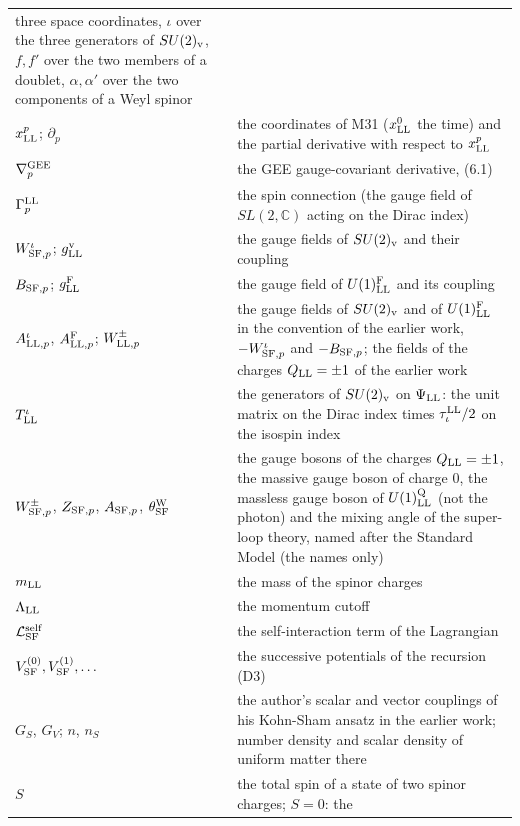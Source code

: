 \documentclass[
  10pt,
]{article}
\begin{document}
\begin{longtable}[]{@{}
  >{\raggedright\arraybackslash}p{}
  >{\raggedright\arraybackslash}p{}@{}}
three space coordinates, \(\iota\) over the three generators of
\(SU(2)_{\rm v}\), \(f,f'\) over the two members of a doublet,
\(\alpha,\alpha'\) over the two components of a Weyl spinor \\
\(x^p_{\rm LL}\); \(\partial_p\) & the coordinates of M31
(\(x^0_{\rm LL}\) the time) and the partial derivative with respect to
\(x^p_{\rm LL}\) \\
\(\nabla^{\rm GEE}_p\) & the GEE gauge-covariant derivative, (6.1) \\
\(\Gamma^{\rm LL}_p\) & the spin connection (the gauge field of
\(SL(2,\mathbb C)\) acting on the Dirac index) \\
\(W^\iota_{{\rm SF},p}\); \(g^{\rm v}_{\rm LL}\) & the gauge fields of
\(SU(2)_{\rm v}\) and their coupling \\
\(B_{{\rm SF},p}\); \(g^{\rm F}_{\rm LL}\) & the gauge field of
\(U(1)^{\rm F}_{\rm LL}\) and its coupling \\
\(A^\iota_{{\rm LL},p}\), \(A^{\rm F}_{{\rm LL},p}\);
\(W^\pm_{{\rm LL},p}\) & the gauge fields of \(SU(2)_{\rm v}\) and of
\(U(1)^{\rm F}_{\rm LL}\) in the convention of the earlier work,
\(-W^\iota_{{\rm SF},p}\) and \(-B_{{\rm SF},p}\); the fields of the
charges \(Q_{\rm LL}=\pm1\) of the earlier work \\
\(T^\iota_{\rm LL}\) & the generators of \(SU(2)_{\rm v}\) on
\(\Psi_{\rm LL}\): the unit matrix on the Dirac index times
\(\tau^{\rm LL}_\iota/2\) on the isospin index \\
\(W^\pm_{{\rm SF},p}\), \(Z_{{\rm SF},p}\), \(A_{{\rm SF},p}\),
\(\theta^{\rm W}_{\rm SF}\) & the gauge bosons of the charges
\(Q_{\rm LL}=\pm1\), the massive gauge boson of charge 0, the massless
gauge boson of \(U(1)^{\rm Q}_{\rm LL}\) (not the photon) and the mixing
angle of the super-loop theory, named after the Standard Model (the
names only) \\
\(m_{\rm LL}\) & the mass of the spinor charges \\
\(\Lambda_{\rm LL}\) & the momentum cutoff \\
\(\mathcal L^{\rm self}_{\rm SF}\) & the self-interaction term of the
Lagrangian \\
\(V^{(0)}_{\rm SF},V^{(1)}_{\rm SF},\dots\) & the successive potentials
of the recursion (D3) \\
\(G_S\), \(G_V\); \(n\), \(n_S\) & the author's scalar and vector
couplings of his Kohn-Sham ansatz in the earlier work; number density
and scalar density of uniform matter there \\
\(S\) & the total spin of a state of two spinor charges; \(S=0\): the

\end{longtable}
\end{document}
